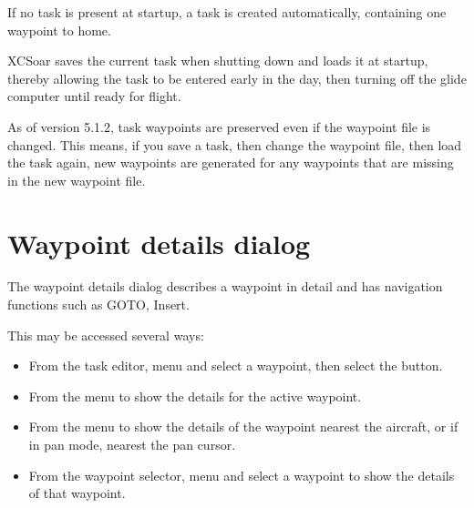 \documentclass[a4paper,12pt]{refrep}
\newcommand{\InfoBox}[0]{{InfoBox}}
\begin{document}
\tip If no task is present at startup, a task is created automatically,
  containing one waypoint to home.

XCSoar saves the current task when shutting down and loads it at
startup, thereby allowing the task to be entered early in the day,
then turning off the glide computer until ready for flight.

As of version 5.1.2, task waypoints are preserved even if the waypoint
file is changed.  This means, if you save a task, then change the
waypoint file, then load the task again, new waypoints are generated
for any waypoints that are missing in the new waypoint file.

\section{Waypoint details dialog}

The waypoint details dialog describes a waypoint in detail and has
navigation functions such as GOTO, Insert.

This may be accessed several ways:
\begin{itemize}
\item
From the task editor, menu \blink{} and select
a waypoint, then select the  button.

\item 
From the menu \blink{} to show the
details for the active waypoint.

\item
From the menu \blink{} to show the
details of the waypoint nearest the aircraft, or if in pan mode,
nearest the pan cursor.

\item
From the waypoint selector, menu \blink{} and select a waypoint to show the details of that waypoint.
\end{itemize}
\end{document}
